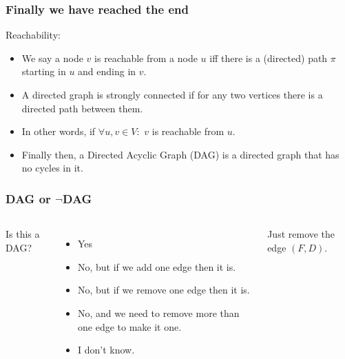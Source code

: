 \begin{frame}
	\frametitle{Finally we have reached the end}

Reachability:
			\begin{itemize}
				\item We say a node $v$ is \alert{reachable} from a node $u$ iff there is a (directed) path $\pi$ starting in
					$u$ and ending in $v$.
					
				\item A directed graph is \alert{strongly connected} if for any two vertices there is a directed path between them.
				\item In other words, if $\forall u,v \in V:$ $v$ is reachable from $u$.
					
				\item Finally then, a \alert{Directed Acyclic Graph (DAG)}  is a directed graph that has no cycles in it.
			\end{itemize}
\end{frame}

\begin{frame}
	\frametitle{DAG or $\neg$DAG}
	
	\begin{columns}[T]
			
		
			Is this a DAG?
			\begin{itemize}
				\item Yes
				\item No, but if we add one edge then it is.
				\item No, but if we remove one edge then it is.
				\item No, and we need to remove more than one edge to make it one.
				\item I don't know.
			\end{itemize}
		
			Just remove the edge $(F,D)$.
	\end{columns}
\end{frame}

